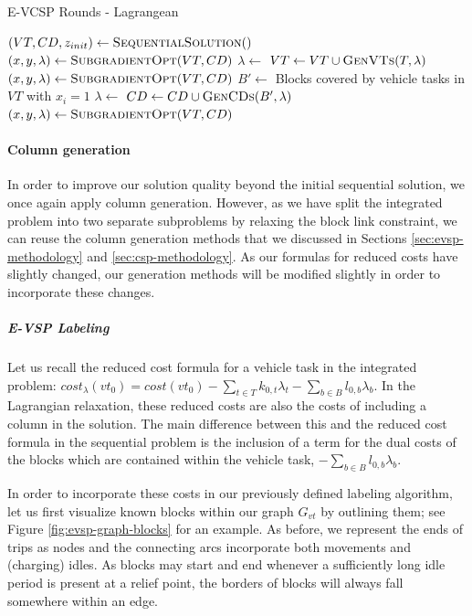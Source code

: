 \documentclass[]{article}
\begin{document}
\begin{algorithm}
\caption{E-VCSP Rounds - Lagrangean}\label{alg:E-VCSP-lagrange}
\begin{algorithmic}
\State $(VT, CD, z_{init}) \gets \Call{SequentialSolution}$
\State $(x, y, \lambda) \gets \Call{SubgradientOpt}{VT, CD}$
    \State $\lambda \gets$ 
    \State $VT \gets VT \cup \Call{GenVTs}{T, \lambda}$
    \State $(x, y, \lambda) \gets \Call{SubgradientOpt}{VT, CD}$
  \EndFor
    \State $B' \gets$ Blocks covered by vehicle tasks in $VT$ with $x_i = 1$
    \State $\lambda \gets$ 
    \State $CD \gets CD \cup \Call{GenCDs}{B', \lambda}$
    \State $(x, y, \lambda) \gets \Call{SubgradientOpt}{VT, CD}$
  \EndFor
\EndWhile
\end{algorithmic}
\end{algorithm}

\paragraph{Column generation} \label{sec:evcsp-cg}
In order to improve our solution quality beyond the initial sequential solution, we once again apply column generation. However, as we have split the integrated problem into two separate subproblems by relaxing the block link constraint, we can reuse the column generation methods that we discussed in Sections \ref{sec:evsp-methodology} and \ref{sec:csp-methodology}. As our formulas for reduced costs have slightly changed, our generation methods will be modified slightly in order to incorporate these changes.

\subparagraph{E-VSP Labeling} Let us recall the reduced cost formula for a vehicle task in the integrated problem: $cost_\lambda(vt_0) = cost(vt_0) - \sum_{t \in T}k_{0,t} \lambda_t - \sum_{b \in B}l_{0,b}\lambda_b$. In the Lagrangian relaxation, these reduced costs are also the costs of including a column in the solution. The main difference between this and the reduced cost formula in the sequential problem is the inclusion of a term for the dual costs of the blocks which are contained within the vehicle task, $-\sum_{b \in B}l_{0,b}\lambda_b$.

In order to incorporate these costs in our previously defined labeling algorithm, let us first visualize known blocks within our graph $G_{vt}$ by outlining them; see Figure \ref{fig:evsp-graph-blocks} for an example. As before, we represent the ends of trips as nodes and the connecting arcs incorporate both movements and (charging) idles. As blocks may start and end whenever a sufficiently long idle period is present at a relief point, the borders of blocks will always fall somewhere within an edge.  
\end{document}
